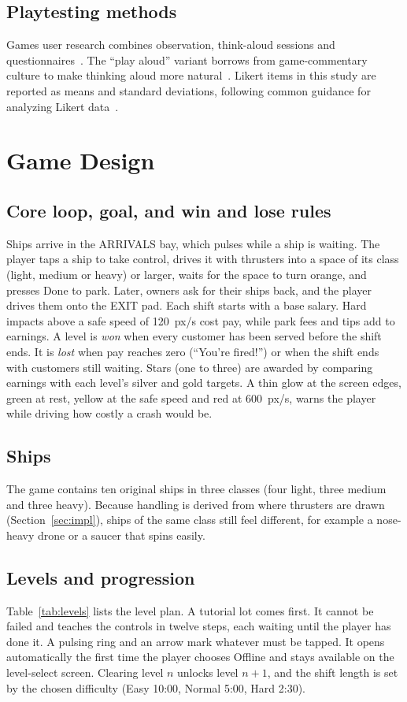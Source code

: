 \documentclass[conference]{IEEEtran}
\begin{document}
\subsection{Playtesting methods}
Games user research combines observation, think-aloud sessions and questionnaires~\cite{desurvire2013,drachen2018}. The ``play aloud'' variant borrows from game-commentary culture to make thinking aloud more natural~\cite{pellicone2022}. Likert items in this study are reported as means and standard deviations, following common guidance for analyzing Likert data~\cite{boone2012}.

\section{Game Design}
\subsection{Core loop, goal, and win and lose rules}
Ships arrive in the ARRIVALS bay, which pulses while a ship is waiting. The player taps a ship to take control, drives it with thrusters into a space of its class (light, medium or heavy) or larger, waits for the space to turn orange, and presses Done to park. Later, owners ask for their ships back, and the player drives them onto the EXIT pad. Each shift starts with a base salary. Hard impacts above a safe speed of 120~px/s cost pay, while park fees and tips add to earnings. A level is \emph{won} when every customer has been served before the shift ends. It is \emph{lost} when pay reaches zero (``You're fired!'') or when the shift ends with customers still waiting. Stars (one to three) are awarded by comparing earnings with each level's silver and gold targets. A thin glow at the screen edges, green at rest, yellow at the safe speed and red at 600~px/s, warns the player while driving how costly a crash would be.

\subsection{Ships}
The game contains ten original ships in three classes (four light, three medium and three heavy). Because handling is derived from where thrusters are drawn (Section~\ref{sec:impl}), ships of the same class still feel different, for example a nose-heavy drone or a saucer that spins easily.

\subsection{Levels and progression}
Table~\ref{tab:levels} lists the level plan. A tutorial lot comes first. It cannot be failed and teaches the controls in twelve steps, each waiting until the player has done it. A pulsing ring and an arrow mark whatever must be tapped. It opens automatically the first time the player chooses Offline and stays available on the level-select screen. Clearing level $n$ unlocks level $n+1$, and the shift length is set by the chosen difficulty (Easy 10:00, Normal 5:00, Hard 2:30).
\end{document}
